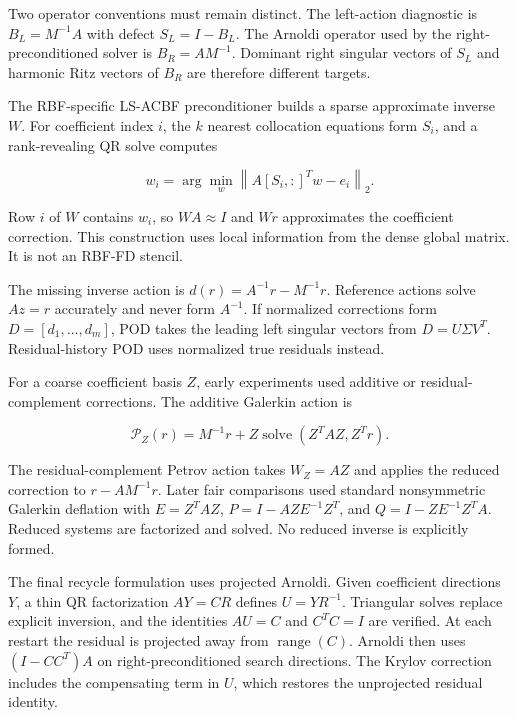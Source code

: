 \documentclass[11pt]{article}
\newcommand{\norm}[1]{\left\lVert #1\right\rVert}
\newcommand{\trans}{^{T}}
\begin{document}
Two operator conventions must remain distinct. The left-action diagnostic is $B_L=M^{-1}A$ with defect $S_L=I-B_L$. The Arnoldi operator used by the right-preconditioned solver is $B_R=AM^{-1}$. Dominant right singular vectors of $S_L$ and harmonic Ritz vectors of $B_R$ are therefore different targets.

The RBF-specific LS-ACBF preconditioner builds a sparse approximate inverse $W$. For coefficient index $i$, the $k$ nearest collocation equations form $S_i$, and a rank-revealing QR solve computes

\begin{equation}
w_i=\arg\min_w\norm{A[S_i,:]\trans w-e_i}_2.
\label{eq:lsacbf}
\end{equation}

Row $i$ of $W$ contains $w_i$, so $WA\approx I$ and $Wr$ approximates the coefficient correction. This construction uses local information from the dense global matrix. It is not an RBF-FD stencil.

The missing inverse action is $d(r)=A^{-1}r-M^{-1}r$. Reference actions solve $Az=r$ accurately and never form $A^{-1}$. If normalized corrections form $D=[d_1,\ldots,d_m]$, POD takes the leading left singular vectors from $D=U\Sigma V\trans$. Residual-history POD uses normalized true residuals instead.

For a coarse coefficient basis $Z$, early experiments used additive or residual-complement corrections. The additive Galerkin action is

\begin{equation}
\mathcal P_Z(r)=M^{-1}r+Z\operatorname{solve}(Z\trans AZ,Z\trans r).
\label{eq:additive}
\end{equation}

The residual-complement Petrov action takes $W_Z=AZ$ and applies the reduced correction to $r-AM^{-1}r$. Later fair comparisons used standard nonsymmetric Galerkin deflation with $E=Z\trans AZ$, $P=I-AZE^{-1}Z\trans$, and $Q=I-ZE^{-1}Z\trans A$. Reduced systems are factorized and solved. No reduced inverse is explicitly formed.

The final recycle formulation uses projected Arnoldi. Given coefficient directions $Y$, a thin QR factorization $AY=CR$ defines $U=YR^{-1}$. Triangular solves replace explicit inversion, and the identities $AU=C$ and $C\trans C=I$ are verified. At each restart the residual is projected away from $\operatorname{range}(C)$. Arnoldi then uses $(I-CC\trans)A$ on right-preconditioned search directions. The Krylov correction includes the compensating term in $U$, which restores the unprojected residual identity.
\end{document}

